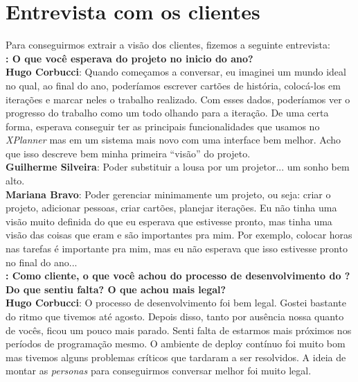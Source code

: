 \section{Entrevista com os clientes}

Para conseguirmos extrair a visão dos clientes, fizemos a seguinte entrevista:\\

\textbf{\textit{\calopsita{}}: O que você esperava do projeto no inicio do ano?}\\

\textbf{Hugo Corbucci}: Quando começamos a conversar, eu imaginei um mundo ideal no qual, ao final do ano, poderíamos escrever cartões de história, colocá-los em iterações e marcar neles o trabalho realizado. Com esses dados, poderíamos ver o progresso do trabalho como um todo olhando para a iteração. De uma certa forma, esperava conseguir ter as principais funcionalidades que usamos no \textit{XPlanner} mas em um sistema mais novo com uma interface bem melhor. Acho que isso descreve bem minha primeira ``visão'' do projeto.\\

\textbf{Guilherme Silveira}: Poder substituir a lousa por um projetor... um sonho bem alto.\\

\textbf{Mariana Bravo}: Poder gerenciar minimamente um projeto, ou seja: criar o projeto, adicionar pessoas, criar cartões, planejar iterações.
Eu não tinha uma visão muito definida do que eu esperava que estivesse pronto, mas tinha uma visão das coisas que eram e são importantes pra mim. Por exemplo, colocar horas nas tarefas é importante pra mim, mas eu não esperava que isso estivesse pronto no final do ano...\\

\textbf{\textit{\calopsita{}}: Como cliente, o que você achou do processo de desenvolvimento do \calopsita{}? Do que sentiu falta? O que achou mais legal?}\\

\textbf{Hugo Corbucci}: O processo de desenvolvimento foi bem legal. Gostei bastante do ritmo que tivemos até agosto. Depois disso, tanto por ausência nossa quanto de vocês, ficou um pouco mais parado. Senti falta de estarmos mais próximos nos períodos de programação mesmo. O ambiente de deploy contínuo foi muito bom mas tivemos alguns problemas críticos que tardaram a ser resolvidos. A ideia de montar as \textit{personas} para conseguirmos conversar melhor foi muito legal.\\

